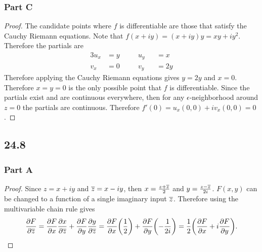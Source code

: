 \documentclass[12pt,titlepage]{extarticle}
\begin{document}
\subsubsection*{Part C}
\begin{proof}
    The candidate points where $f$ is differentiable are those that satisfy the Cauchy Riemann equations. Note that $f(x+iy) = (x + iy) y = xy + i y^2$. Therefore the partials are
    \begin{alignat*}{3}
        u_x &= y &\quad& u_y &&= x \\
        v_x &= 0 && v_y &&= 2y
    \end{alignat*}
    Therefore applying the Cauchy Riemann equations gives $y = 2y$ and $x = 0$. Therefore $x = y = 0$ is the only possible point that $f$ is differentiable. Since the partials exist and are continuous everywhere, then for any $\epsilon$-neighborhood around $z = 0$ the partials are continuous. Therefore $f'(0) = u_x(0, 0) + iv_x(0,0) = 0$.
\end{proof}

\subsection*{24.8}
\subsubsection*{Part A}
\begin{proof}
    Since $z = x + iy$ and $\overline{z} = x - iy$, then $x = \frac{z + \overline{z}}{2}$ and $y = \frac{z - \overline{z}}{2i}$. $F(x,y)$ can be changed to a function of a single imaginary input $\overline{z}$. Therefore using the multivariable chain rule gives
    \[
        \pdv{F}{\overline{z}} = \pdv{F}{x} \pdv{x}{\overline{z}} + \pdv{F}{y} \pdv{y}{\overline{z}} = \pdv{F}{x} \qty(\frac{1}{2}) + \pdv{F}{y}\qty(-\frac{1}{2i}) = \frac{1}{2} \qty(\pdv{F}{x} + i \pdv{F}{y})
    .\]
\end{proof}
\end{document}
